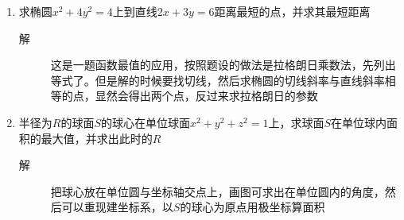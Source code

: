 \begin{enumerate}
\item 求椭圆$x^2+4y^2=4$上到直线$2x+3y=6$距离最短的点，并求其最短距离
\begin{description}
\item[解] 这是一题函数最值的应用，按照题设的做法是拉格朗日乘数法，先列出等式了。但是解的时候要找切线，然后求椭圆的切线斜率与直线斜率相等的点，显然会得出两个点，反过来求拉格朗日的参数
\end{description}

\item 半径为$R$的球面$S$的球心在单位球面$x^2+y^2+z^2=1$上，求球面$S$在单位球内面积的最大值，并求出此时的$R$
\begin{description}
\item[解] 把球心放在单位圆与坐标轴交点上，画图可求出在单位圆内的角度，然后可以重现建坐标系，以$S$的球心为原点用极坐标算面积
\end{description}
























\end{enumerate}